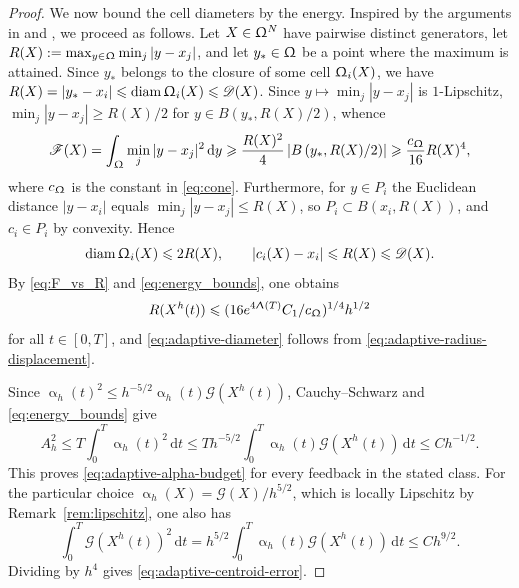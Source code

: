 \documentclass[letterpaper,11pt,twoside]{article}
\numberwithin{figure}{section}
\numberwithin{table}{section}
\theoremstyle{cpamplain}
\theoremstyle{cpamdefinition}
\newcommand{\diff}{\mathrm{d}}
\let\alpha\upalpha
\let\Lambda\Uplambda
\let\Omega\Upomega
\renewcommand{\le}{\leqslant}
\renewcommand{\ge}{\geqslant}
\numberwithin{equation}{section}
\begin{document}
\begin{proof}
We now bound the cell diameters by the energy.
Inspired by the arguments in \cite[Section~2.5]{KriegSonnleitner2024} and \cite[proof of Proposition~2.1]{ElNmeirLuschgyPages2022}, we proceed as follows.
Let $X\in\Omega^N$ have pairwise distinct generators, let $R(X):=\max_{y\in\Omega}\min_j|y-x_j|$, and let $y_\ast\in\Omega$ be a point where the maximum is attained.
Since $y_\ast$ belongs to the closure of some cell $\Omega_i(X)$, we have $R(X)=|y_\ast-x_i|\le\operatorname{diam}\Omega_i(X)\le\mathscr D(X)$.
Since $y\mapsto\min_j|y-x_j|$ is $1$-Lipschitz, $\min_j|y-x_j|\ge R(X)/2$ for $y\in B(y_\ast,R(X)/2)$, whence
\begin{equation}\label{eq:F_vs_R}
\mathscr F(X)
=\int_\Omega\min_j|y-x_j|^2\,\diff y
\ge\frac{R(X)^2}{4}\left|B\left(y_\ast,R(X)/2\right)\right|
\ge\frac{c_\Omega}{16}R(X)^4,
\end{equation}
where $c_\Omega$ is the constant in \eqref{eq:cone}.
Furthermore, for $y\in P_i$ the Euclidean distance $|y-x_i|$ equals $\min_j|y-x_j|\le R(X)$, so $P_i\subset B(x_i,R(X))$, and $c_i\in P_i$ by convexity. Hence
\begin{equation}\label{eq:adaptive-radius-displacement}
\operatorname{diam}\Omega_i(X)\le2R(X),
\qquad |c_i(X)-x_i|\le R(X)\le\mathscr D(X).
\end{equation}
By \eqref{eq:F_vs_R} and \eqref{eq:energy_bounds}, one obtains
\begin{equation}\label{eq:rf}
R(X^h(t))\le(16e^{4\Lambda(T)}C_1/c_\Omega)^{1/4}h^{1/2}
\end{equation}
 for all $t\in[0,T]$, and \eqref{eq:adaptive-diameter} follows from \eqref{eq:adaptive-radius-displacement}.

Since $\alpha_h(t)^2\le h^{-5/2}\alpha_h(t)\mathscr G(X^h(t))$, Cauchy--Schwarz and \eqref{eq:energy_bounds} give
\begin{equation}\label{eq:alpha_squared}
A_h^2\le T\int_0^T\alpha_h(t)^2\,\diff t
\le T h^{-5/2}\int_0^T\alpha_h(t)\mathscr G(X^h(t))\,\diff t
\le Ch^{-1/2}.
\end{equation}
This proves \eqref{eq:adaptive-alpha-budget} for every feedback in the stated class.
For the particular choice $\alpha_h(X)=\mathscr G(X)/h^{5/2}$, which is locally Lipschitz by Remark~\ref{rem:lipschitz}, one also has
\[
\int_0^T\mathscr G(X^h(t))^2\,\diff t
=h^{5/2}\int_0^T\alpha_h(t)\mathscr G(X^h(t))\,\diff t
\le Ch^{9/2}.
\]
Dividing by $h^4$ gives \eqref{eq:adaptive-centroid-error}.


\end{proof}
\end{document}
